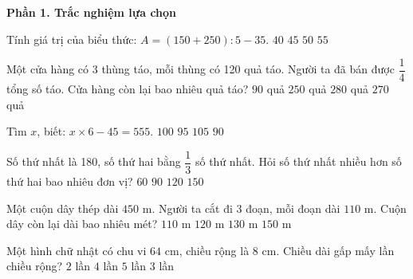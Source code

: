 \textbf{Phần 1. Trắc nghiệm lựa chọn}

\begin{ex} %
Tính giá trị của biểu thức: $A = (150 + 250) : 5 - 35$.
\choice
{$40$}
{\True $45$}
{$50$}
{$55$}
\end{ex}

\begin{ex} %
Một cửa hàng có 3 thùng táo, mỗi thùng có 120 quả táo. Người ta đã bán được $\dfrac{1}{4}$ tổng số táo. Cửa hàng còn lại bao nhiêu quả táo?
\choice
{$90$ quả}
{$250$ quả}
{$280$ quả}
{\True $270$ quả}
\end{ex}

\begin{ex} %
Tìm $x$, biết: $x \times 6 - 45 = 555$.
\choice
{\True $100$}
{$95$}
{$105$}
{$90$}
\end{ex}

\begin{ex} %
Số thứ nhất là 180, số thứ hai bằng $\dfrac{1}{3}$ số thứ nhất. Hỏi số thứ nhất nhiều hơn số thứ hai bao nhiêu đơn vị?
\choice
{$60$}
{$90$}
{\True $120$}
{$150$}
\end{ex}

\begin{ex} %
Một cuộn dây thép dài $450\text{ m}$. Người ta cắt đi 3 đoạn, mỗi đoạn dài $110\text{ m}$. Cuộn dây còn lại dài bao nhiêu mét?
\choice
{$110\text{ m}$}
{\True $120\text{ m}$}
{$130\text{ m}$}
{$150\text{ m}$}
\end{ex}

\begin{ex} %
Một hình chữ nhật có chu vi $64\text{ cm}$, chiều rộng là $8\text{ cm}$. Chiều dài gấp mấy lần chiều rộng?
\choice
{$2$ lần}
{$4$ lần}
{$5$ lần}
{\True $3$ lần}
\end{ex}

